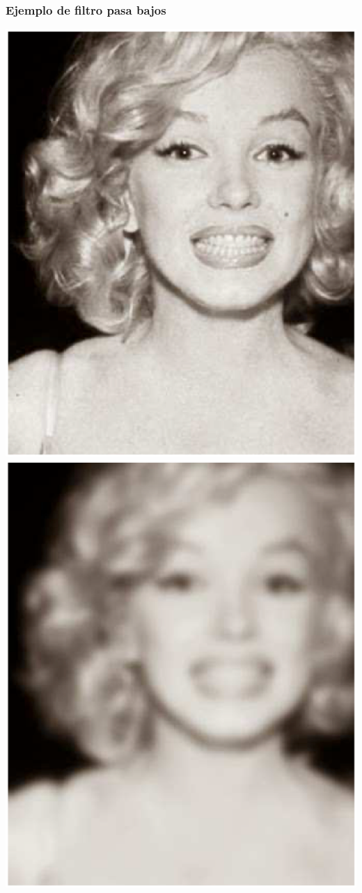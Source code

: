 \begin{frame}
\frametitle{Ejemplo de filtro pasa bajos}
\centering
\includegraphics[scale=0.27]{Imagenes/Marylin_01.eps}
\pause
\includegraphics[scale=0.27]{Imagenes/Marylin_02.eps}
\end{frame}
